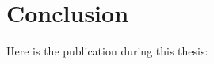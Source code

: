 
\chapter{Conclusion\label{chpt:conclusion}}

Here is the publication during this thesis:

\bigskip{}


\noindent \begin{refsection}[ownpubs]
	\small
	\nocite{*}
	\printbibliography[heading=none]
\end{refsection}
